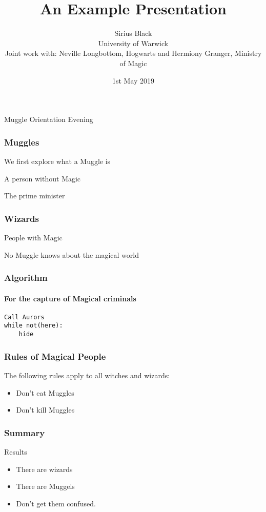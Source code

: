 \documentclass[aspectratio=169]{beamer}
\title{An Example Presentation}
\author[Sirius Black]{Sirius Black\\ University of Warwick\\[0.5cm] Joint work with: Neville Longbottom, Hogwarts and Hermiony Granger, Ministry of Magic}
\institute[Warwick]{}
\date{1st May 2019}
\begin{document}
 


\begin{frame}
\maketitle

\centering
Muggle Orientation Evening

\end{frame}

 
\begin{frame}
\frametitle{Muggles}
We first explore what a Muggle is 

\begin{definition}[Muggle]
A person without Magic

\end{definition}


\begin{example}[Muggle]
The prime minister

\end{example}
\end{frame}

 
\begin{frame}
\frametitle{Wizards}
\begin{definition}[Wizards]
People with Magic
\end{definition} 

\pause
\begin{theorem}
No Muggle knows about the magical world
\end{theorem} 

\end{frame}

\begin{frame}[fragile]
\frametitle{Algorithm}
\framesubtitle{For the capture of Magical criminals}

\begin{lstlisting}[mathescape=true]
Call Aurors
while not(here):
	hide
\end{lstlisting}


\end{frame}

\begin{frame}
\frametitle{Rules of Magical People}

The following rules apply to all witches and wizards:
\begin{itemize}
\item Don't eat Muggles
\item Don't kill Muggles
\end{itemize}

\end{frame}

\begin{frame}
\frametitle{Summary}

\begin{block}{Results}
\begin{itemize}
	\item There are wizards
	\item There are Muggels
	\pause
	\item Don't get them confused.
\end{itemize}
\end{block}

\end{frame}
 
\end{document}
